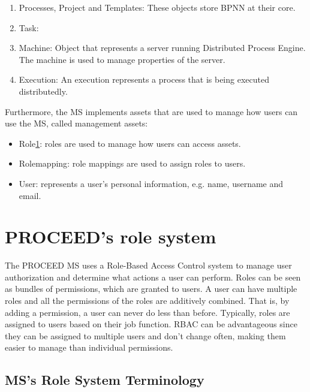 \begin{enumerate}
  \item Processes, Project and Templates: These objects store BPNN at their core.
  \item Task:
  \item Machine: Object that represents a server running Distributed Process Engine. The
    machine is used to manage properties of the server.
  \item Execution: An execution represents a process that is being executed distributedly.
\end{enumerate}

Furthermore, the MS implements assets that are used to manage how users can use the MS,
called management assets: 

\begin{itemize}
  \item Role\ref{cha:relatedwork:proceedroles}: roles are used to manage how users can access assets.
  \item{Rolemapping}: role mappings are used to assign roles to users.
  \item User: represents a user's personal information, e.g. name, username and email.
\end{itemize}


\section{PROCEED's role system}
\label{cha:relatedwork:proceedroles}

The PROCEED MS uses a Role-Based Access Control %
system to manage user authorization and determine what actions a user can perform.
Roles can be seen as bundles of permissions, which are granted to users.
A user can have multiple roles and all the permissions of the roles are additively
combined. That is, by adding a permission, a user can never do less than before.
Typically, roles are assigned to users based on their job function.
RBAC can be advantageous since they can be assigned to multiple users and 
don't change often, making them easier to manage than individual permissions.

\subsection{MS's Role System Terminology}
\label{cha:relatedwork:proceedroles:terminology}

